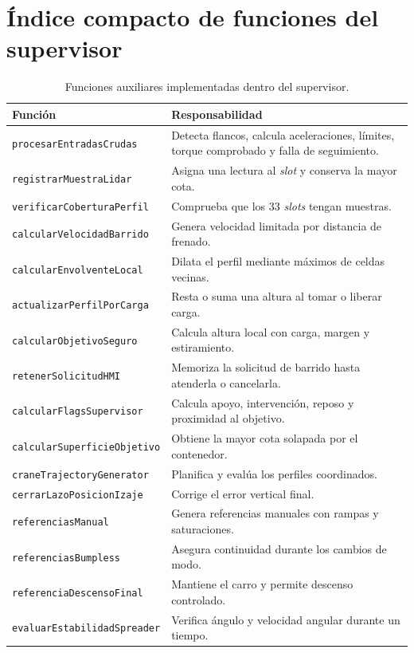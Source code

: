 \documentclass[a4paper,10pt,onecolumn,journal]{ieeeconf}
\numberwithin{equation}{section}
\begin{document}
\section{Índice compacto de funciones del supervisor}
\begin{table}[H]
\centering
\small
\caption{Funciones auxiliares implementadas dentro del supervisor.}
\begin{tabular}{L{5.2cm} L{8.5cm}}
\toprule
Función & Responsabilidad\\
\midrule
\texttt{procesarEntradasCrudas} & Detecta flancos, calcula aceleraciones, límites, torque comprobado y falla de seguimiento.\\
\texttt{registrarMuestraLidar} & Asigna una lectura al \textit{slot} y conserva la mayor cota.\\
\texttt{verificarCoberturaPerfil} & Comprueba que los 33 \textit{slots} tengan muestras.\\
\texttt{calcularVelocidadBarrido} & Genera velocidad limitada por distancia de frenado.\\
\texttt{calcularEnvolventeLocal} & Dilata el perfil mediante máximos de celdas vecinas.\\
\texttt{actualizarPerfilPorCarga} & Resta o suma una altura al tomar o liberar carga.\\
\texttt{calcularObjetivoSeguro} & Calcula altura local con carga, margen y estiramiento.\\
\texttt{retenerSolicitudHMI} & Memoriza la solicitud de barrido hasta atenderla o cancelarla.\\
\texttt{calcularFlagsSupervisor} & Calcula apoyo, intervención, reposo y proximidad al objetivo.\\
\texttt{calcularSuperficie}\newline\texttt{Objetivo} & Obtiene la mayor cota solapada por el contenedor.\\
\texttt{craneTrajectoryGenerator} & Planifica y evalúa los perfiles coordinados.\\
\texttt{cerrarLazoPosicionIzaje} & Corrige el error vertical final.\\
\texttt{referenciasManual} & Genera referencias manuales con rampas y saturaciones.\\
\texttt{referenciasBumpless} & Asegura continuidad durante los cambios de modo.\\
\texttt{referenciaDescensoFinal} & Mantiene el carro y permite descenso controlado.\\
\texttt{evaluarEstabilidad}\newline\texttt{Spreader} & Verifica ángulo y velocidad angular durante un tiempo.\\

\end{tabular}
\end{table}
\end{document}
